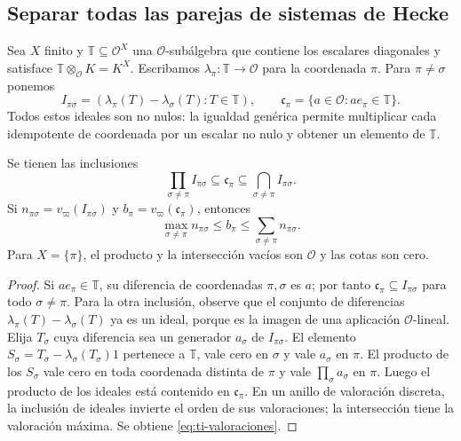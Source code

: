 \subsection{Separar todas las parejas de sistemas de Hecke}

Sea $X$ finito y $\mathbb T\subseteq\mathcal O^X$ una
$\mathcal O$-subálgebra que contiene los escalares diagonales
y satisface $\mathbb T\otimes_{\mathcal O}K=K^X$.
Escribamos $\lambda_\pi:\mathbb T\to\mathcal O$ para la
coordenada $\pi$. Para $\pi\ne\sigma$ ponemos
\begin{equation}
 I_{\pi\sigma}=(\lambda_\pi(T)-\lambda_\sigma(T):T\in\mathbb T),
 \qquad
 \mathfrak c_\pi=\{a\in\mathcal O:a e_\pi\in\mathbb T\}.
 \label{eq:ti-ideales}
\end{equation}
Todos estos ideales son no nulos: la igualdad genérica permite
multiplicar cada idempotente de coordenada por un escalar no nulo
y obtener un elemento de $\mathbb T$.

\begin{teorema}
\label{thm:ti-separadores}
Se tienen las inclusiones
\begin{equation}
 \prod_{\sigma\ne\pi}I_{\pi\sigma}
 \subseteq\mathfrak c_\pi
 \subseteq\bigcap_{\sigma\ne\pi}I_{\pi\sigma}.
 \label{eq:ti-ideales-bilateral}
\end{equation}
Si $n_{\pi\sigma}=v_\varpi(I_{\pi\sigma})$ y
$b_\pi=v_\varpi(\mathfrak c_\pi)$, entonces
\begin{equation}
 \max_{\sigma\ne\pi}n_{\pi\sigma}
 \le b_\pi\le\sum_{\sigma\ne\pi}n_{\pi\sigma}.
 \label{eq:ti-valoraciones}
\end{equation}
Para $X=\{\pi\}$, el producto y la intersección vacíos son
$\mathcal O$ y las cotas son cero.
\end{teorema}
\begin{proof}
Si $a e_\pi\in\mathbb T$, su diferencia de coordenadas
$\pi,\sigma$ es $a$; por tanto $\mathfrak c_\pi\subseteq
I_{\pi\sigma}$ para todo $\sigma\ne\pi$.
Para la otra inclusión, observe que el conjunto de diferencias
$\lambda_\pi(T)-\lambda_\sigma(T)$ ya es un ideal, porque
es la imagen de una aplicación $\mathcal O$-lineal.
Elija $T_\sigma$ cuya diferencia sea un generador
$a_\sigma$ de $I_{\pi\sigma}$.
El elemento $S_\sigma=T_\sigma-\lambda_\sigma(T_\sigma)1$
pertenece a $\mathbb T$, vale cero en $\sigma$ y vale
$a_\sigma$ en $\pi$. El producto de los $S_\sigma$ vale
cero en toda coordenada distinta de $\pi$ y vale
$\prod_\sigma a_\sigma$ en $\pi$.
Luego el producto de los ideales está contenido en
$\mathfrak c_\pi$. En un anillo de valoración discreta,
la inclusión de ideales invierte el orden de sus valoraciones;
la intersección tiene la valoración máxima. Se obtiene
\eqref{eq:ti-valoraciones}.
\end{proof}

